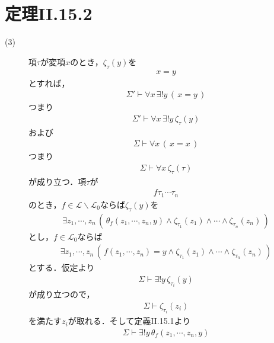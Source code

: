 \section{定理I\hspace{-.1em}I.15.2}
	\begin{description}
		\item[(3)]
			項$\tau$が変項$x$のとき，$\zeta_{\tau}(y)$を
			\begin{align}
				x = y
			\end{align}
			とすれば，
			\begin{align}
				\Sigma' \vdash \forall x\, \exists! y\, (\, x=y\, )
			\end{align}
			つまり
			\begin{align}
				\Sigma' \vdash \forall x\, \exists! y\, \zeta_{\tau}(y)
			\end{align}
			および
			\begin{align}
				\Sigma \vdash \forall x\, (\, x=x\, )
			\end{align}
			つまり
			\begin{align}
				\Sigma \vdash \forall x\, \zeta_{\tau}(\tau)
			\end{align}
			が成り立つ．項$\tau$が
			\begin{align}
				f\tau_{1}\cdots\tau_{n}
			\end{align}
			のとき，$f \in \mathcal{L} \backslash \mathcal{L}_{0}$ならば$\zeta_{\tau}(y)$を
			\begin{align}
				\exists z_{1}, \cdots, z_{n}\, \left(\, 
				\theta_{f}(z_{1},\cdots,z_{n},y) \wedge \zeta_{\tau_{1}}(z_{1}) \wedge
				\cdots \wedge \zeta_{\tau_{n}}(z_{n})\, \right)
			\end{align}
			とし，$f \in \mathcal{L}_{0}$ならば
			\begin{align}
				\exists z_{1}, \cdots, z_{n}\, \left(\, 
				f(z_{1},\cdots,z_{n}) = y \wedge \zeta_{\tau_{1}}(z_{1}) \wedge
				\cdots \wedge \zeta_{\tau_{n}}(z_{n})\, \right)
			\end{align}
			とする．仮定より
			\begin{align}
				\Sigma \vdash \exists! y\, \zeta_{\tau_{i}}(y)
			\end{align}
			が成り立つので，
			\begin{align}
				\Sigma \vdash \zeta_{\tau_{i}}(z_{i})
			\end{align}
			を満たす$z_{i}$が取れる．そして定義I\hspace{-.1em}I.15.1より
			\begin{align}
				\Sigma \vdash \exists!y\, \theta_{f}(z_{1},\cdots,z_{n},y)

\end{align}
\end{description}

